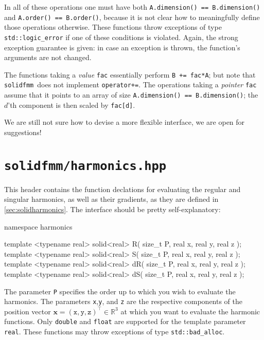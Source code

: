 \documentclass{scrbook}
\newcommand{\solidfmm}{\texttt{solidfmm}}
\newcommand{\reals}{\ensuremath{\mathbb{R}}}
\newcommand{\wholespace}{\ensuremath{\reals^3}}
\newcommand{\vv}[1]{\ensuremath{\symbf{#1}}} %
\begin{document}
In all of these operations one must have both \lstinline|A.dimension() == B.dimension()| and \lstinline|A.order() == B.order()|, because it is not
clear how to meaningfully define those operations otherwise. These functions
throw exceptions of type \lstinline|std::logic_error| if one of these conditions
is violated. Again, the strong exception guarantee is given: in case an
exception is thrown, the function's arguments are not changed.

The functions taking a \emph{value} \lstinline|fac| essentially perform
\lstinline|B += fac*A|; but note that \solidfmm\ does not implement
\lstinline|operator+=|. The operations taking a \emph{pointer} \lstinline|fac|
assume that it points to an array of size \lstinline|A.dimension() == B.dimension()|; the $d$'th component is then scaled by \lstinline|fac[d]|.

We are still not sure how to devise a more flexible interface, we are open
for suggestions!


\section{\texttt{solidfmm/harmonics.hpp}}\label{sec:harmonicshpp}
This header contains the function declations for evaluating the regular and
singular harmonics, as well as their gradients, as they are defined in
\cref{sec:solidharmonics}. The interface should be pretty self-explanatory:
\begin{cppcode*}
namespace harmonics
{

template <typename real> solid<real>  R( size_t P, real x, real y, real z );
template <typename real> solid<real>  S( size_t P, real x, real y, real z );
template <typename real> solid<real> dR( size_t P, real x, real y, real z );
template <typename real> solid<real> dS( size_t P, real x, real y, real z );

}
\end{cppcode*}

The parameter \lstinline|P| specifies the order up to which you wish to evaluate
the harmonics. The parameters \lstinline|x|,\lstinline|y|, and \lstinline|z| are
the respective components of the position vector $\vv{x}=(\mathtt{x},\mathtt{y},\mathtt{z})^\top\in\wholespace$ at which
you want to evaluate the harmonic functions. Only \lstinline[style=cpp]|double|
and \lstinline[style=cpp]|float| are supported for the template parameter
\lstinline|real|. These functions may throw exceptions of type
\lstinline|std::bad_alloc|.
\end{document}
